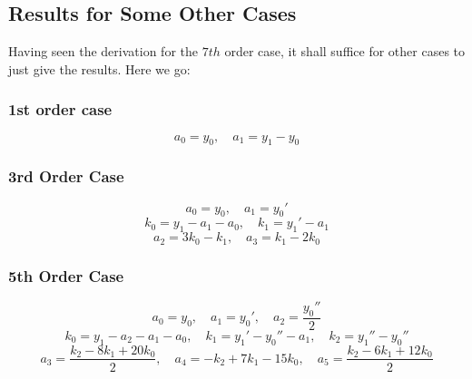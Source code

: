 \subsection{Results for Some Other Cases}
Having seen the derivation for the $7th$ order case, it shall suffice for other cases to just give the results. Here we go:

\subsubsection{1st order case}
\begin{equation}
 a_0 = y_0, \quad a_1 = y_1 - y_0
\end{equation}

\subsubsection{3rd Order Case}
\begin{equation}
 a_0 = y_0, \quad a_1 = y_0'
\end{equation}
\begin{equation}
 k_0 = y_1 - a_1 - a_0, \quad k_1 = y_1' - a_1
\end{equation}
\begin{equation}
 a_2 = 3 k_0 - k_1, \quad a_3 = k_1 - 2 k_0
\end{equation}

\subsubsection{5th Order Case}
\begin{equation}
 a_0 = y_0, \quad a_1 = y_0', \quad a_2 = \frac{y_0''}{2}
\end{equation}
\begin{equation}
 k_0 = y_1 - a_2 - a_1 - a_0, \quad k_1 = y_1' - y_0'' - a_1, \quad k_2 = y_1'' - y_0''
\end{equation}
\begin{equation}
 a_3 = \frac{k_2 - 8 k_1 + 20 k_0}{2}, \quad
 a_4 = -k_2 + 7 k_1 - 15 k_0,          \quad
 a_5 = \frac{k_2 - 6 k_1 + 12 k_0}{2}
\end{equation}

